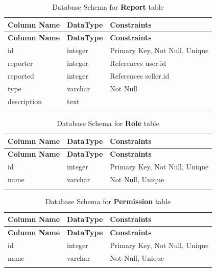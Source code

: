 \documentclass[12pt]{report}
\begin{document}
\begin{longtable}[H]{|l|l|p{6.5cm}||}
	\hline
	\textbf{Column Name} & \textbf{DataType} & \textbf{Constraints}          \\
	\hline
	\endfirsthead
	\hline
	\textbf{Column Name} & \textbf{DataType} & \textbf{Constraints}          \\
	\hline
	\endhead
	id                   & integer           & Primary Key, Not Null, Unique \\
	\hline
	reporter             & integer           & References user.id            \\
	\hline
	reported             & integer           & References seller.id          \\
	\hline
	type                 & varchar           & Not Null                      \\
	\hline
	description          & text              &                               \\
	\hline
	\hline
	\caption{Database Schema for \textbf{Report} table}\label{tab:tableReport}
\end{longtable}

\begin{longtable}[H]{|l|l|p{6.5cm}||}
	\hline
	\textbf{Column Name} & \textbf{DataType} & \textbf{Constraints}          \\
	\hline
	\endfirsthead
	\hline
	\textbf{Column Name} & \textbf{DataType} & \textbf{Constraints}          \\
	\hline
	\endhead
	id                   & integer           & Primary Key, Not Null, Unique \\
	\hline
	name                 & varchar           & Not Null, Unique              \\
	\hline
	\hline
	\caption{Database Schema for \textbf{Role} table}\label{tab:tableRole}
\end{longtable}

\begin{longtable}[H]{|l|l|p{6.5cm}||}
	\hline
	\textbf{Column Name} & \textbf{DataType} & \textbf{Constraints}          \\
	\hline
	\endfirsthead
	\hline
	\textbf{Column Name} & \textbf{DataType} & \textbf{Constraints}          \\
	\hline
	\endhead
	id                   & integer           & Primary Key, Not Null, Unique \\
	\hline
	name                 & varchar           & Not Null, Unique              \\
	\hline
	\hline
	\caption{Database Schema for \textbf{Permission} table}\label{tab:tablePermission}
\end{longtable}
\end{document}
